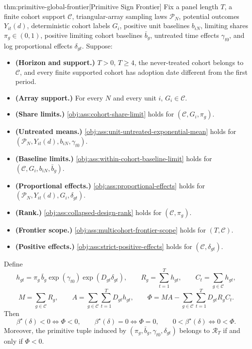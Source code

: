 \begin{theoremv}{thm:primitive-global-frontier}[Primitive Sign Frontier]
Fix a panel length \(T\), a finite cohort support \(\mathcal C\), triangular-array sampling laws \(\mathcal P_N\), potential outcomes \(Y_{it}(d)\), deterministic cohort labels \(G_i\), positive unit baselines \(b_{iN}\), limiting shares \(\pi_g\in(0,1)\), positive limiting cohort baselines \(\bar b_g\), untreated time effects \(\gamma_{t0}\), and log proportional effects \(\delta_{gt}\). Suppose:
\begin{itemize}
\item \textbf{(Horizon and support.)} \(T>0\), \(T\ge 4\), the never-treated cohort belongs to \(\mathcal C\), and every finite supported cohort has adoption date different from the first period.
\item \textbf{(Array support.)} For every \(N\) and every unit \(i\), \(G_i\in\mathcal C\).
\item \textbf{(Share limits.)} \cref{obj:ass:cohort-share-limit} holds for \((\mathcal C,G_i,\pi_g)\).
\item \textbf{(Untreated means.)} \cref{obj:ass:unit-untreated-exponential-mean} holds for \((\mathcal P_N,Y_{it}(d),b_{iN},\gamma_{t0})\).
\item \textbf{(Baseline limits.)} \cref{obj:ass:within-cohort-baseline-limit} holds for \((\mathcal C,G_i,b_{iN},\bar b_g)\).
\item \textbf{(Proportional effects.)} \cref{obj:ass:proportional-effects} holds for \((\mathcal P_N,Y_{it}(d),G_i,\delta_{gt})\).
\item \textbf{(Rank.)} \cref{obj:ass:collapsed-design-rank} holds for \((\mathcal C,\pi_g)\).
\item \textbf{(Frontier scope.)} \cref{obj:ass:multicohort-frontier-scope} holds for \((T,\mathcal C)\).
\item \textbf{(Positive effects.)} \cref{obj:ass:strict-positive-effects} holds for \((\mathcal C,\delta_{gt})\).
\end{itemize}
Define
\[
h_{gt}
=
\pi_g\,\bar b_g\exp(\gamma_{t0})\exp(D_{gt}\delta_{gt}),
\qquad
R_g=\sum_{t=1}^T h_{gt},
\qquad
C_t=\sum_{g\in\mathcal C} h_{gt},
\]
\[
M=\sum_{g\in\mathcal C}R_g,
\qquad
A=\sum_{g\in\mathcal C}\sum_{t=1}^T D_{gt}h_{gt},
\qquad
\Phi
=
MA-\sum_{g\in\mathcal C}\sum_{t=1}^T D_{gt}R_gC_t .
\]
Then
\[
\beta^\star(\delta)<0\iff \Phi<0,\qquad
\beta^\star(\delta)=0\iff \Phi=0,\qquad
0<\beta^\star(\delta)\iff 0<\Phi .
\]
Moreover, the primitive tuple induced by \((\pi_g,\bar b_g,\gamma_{t0},\delta_{gt})\) belongs to \(\mathcal R_T\) if and only if \(\Phi<0\).


\end{theoremv}
